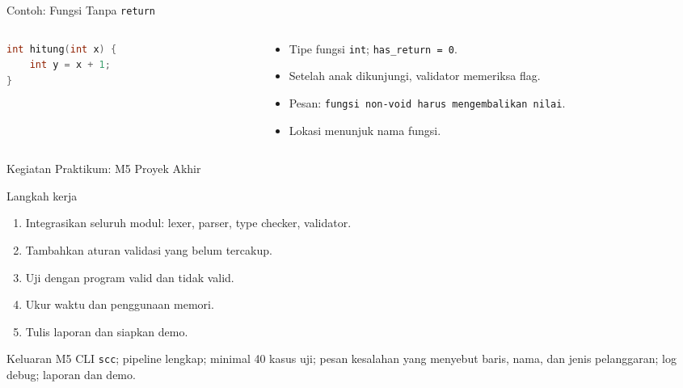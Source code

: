 \documentclass[aspectratio=169,10pt,t]{beamer}
\begin{document}
\begin{frame}[fragile]{Contoh: Fungsi Tanpa \texttt{return}}
  \begin{columns}[T,onlytextwidth]
    \begin{column}{0.48\textwidth}
      \begin{lstlisting}[language=C,numbers=none,
        caption={Fungsi non-void tanpa return}]
int hitung(int x) {
    int y = x + 1;
}
      \end{lstlisting}
    \end{column}
    \begin{column}{0.48\textwidth}
      \begin{itemize}
        \item Tipe fungsi \texttt{int}; \texttt{has\_return = 0}.
        \item Setelah anak dikunjungi, validator memeriksa flag.
        \item Pesan:
              \texttt{fungsi non-void harus mengembalikan nilai}.
        \item Lokasi menunjuk nama fungsi.
      \end{itemize}
    \end{column}
  \end{columns}
\end{frame}

\begin{frame}{Kegiatan Praktikum: M5 Proyek Akhir}
  \begin{block}{Langkah kerja}
    \footnotesize
    \begin{enumerate}
      \setlength{\itemsep}{1pt}
      \item Integrasikan seluruh modul: lexer, parser, type checker,
            validator.
      \item Tambahkan aturan validasi yang belum tercakup.
      \item Uji dengan program valid dan tidak valid.
      \item Ukur waktu dan penggunaan memori.
      \item Tulis laporan dan siapkan demo.
    \end{enumerate}
  \end{block}

  \vspace{3pt}
  \begin{exampleblock}{Keluaran M5}
    \footnotesize
    CLI \texttt{scc}; pipeline lengkap; minimal 40 kasus uji; pesan
    kesalahan yang menyebut baris, nama, dan jenis pelanggaran; log
    debug; laporan dan demo.
  \end{exampleblock}
\end{frame}
\end{document}
